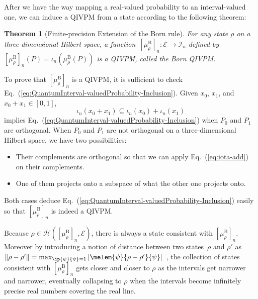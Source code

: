 \documentclass[english,reprint, aps, prl,superscriptaddress, showpacs,
showkeys, longbibliography, amsmath, amssymb, floatfix]{revtex4-1}
\theoremstyle{plain}
\newtheorem{thm}{Theorem}
\theoremstyle{definition}
\newcommand{\Hilb}{\mathcal{H}}
\newcommand{\events}{\ensuremath{\mathcal{E}}}
\newcommand{\coreBorn}{\ensuremath{\overline{\Hilb}}}
\begin{document}
After we have the way mapping a real-valued probability to an interval-valued
one, we can induce a QIVPM from a state according to the following
theorem:

\begin{thm}[Finite-precision Extension of the Born rule]\label{thm:Finite-precision-Born}For
any state $\rho$ on a three-dimensional Hilbert space, a function~$\left[\mu_{\rho}^{\mathrm{B}}\right]_{n}:\events\rightarrow\mathscr{I}_{n}$
defined by $\left[\mu_{\rho}^{\mathrm{B}}\right]_{n}\left(P\right)=\iota_{n}\left(\mu_{\rho}^{\mathrm{B}}\left(P\right)\right)$
is a QIVPM, called the Born QIVPM.\end{thm}

\noindent To prove that $\left[\mu_{\rho}^{\mathrm{B}}\right]_{n}$
is a QIVPM, it is sufficient to check Eq.~(\ref{eq:QuantumInterval-valuedProbability-Inclusion}).
Given $x_{0}$, $x_{1}$, and $x_{0}+x_{1}\in\left[0,1\right]$,
\begin{equation}
\iota_{n}\left(x_{0}+x_{1}\right)\subseteq\iota_{n}\left(x_{0}\right)+\iota_{n}\left(x_{1}\right)\label{eq:iota-add}
\end{equation}
implies Eq.~(\ref{eq:QuantumInterval-valuedProbability-Inclusion})
when $P_{0}$ and $P_{1}$ are orthogonal. When $P_{0}$ and $P_{1}$
are not orthogonal on a three-dimensional Hilbert space, we have two
possibilities:
\begin{itemize}
\item Their complements are orthogonal so that we can apply Eq.~(\ref{eq:iota-add})
on their complements.
\item One of them projects onto a subspace of what the other one projects
onto.
\end{itemize}
\noindent Both cases deduce Eq.~(\ref{eq:QuantumInterval-valuedProbability-Inclusion})
easily so that $\left[\mu_{\rho}^{\mathrm{B}}\right]_{n}$ is indeed
a QIVPM.

Because $\rho\in\coreBorn\left(\left[\mu_{\rho}^{\mathrm{B}}\right]_{n},\events\right)$,
there is always a state consistent with $\left[\mu_{\rho}^{\mathrm{B}}\right]_{n}$.
Moreover by introducing a notion of distance between two states~$\rho$
and $\rho'$ as $\left\Vert \rho-\rho'\right\Vert =\max_{\ip{\psi}{\psi}=1}\left|\melem{\psi}{\rho-\rho'}{\psi}\right|$~\citep{544199},
the collection of states consistent with $\left[\mu_{\rho}^{\mathrm{B}}\right]_{n}$
gets closer and closer to $\rho$ as the intervals get narrower and
narrower, eventually collapsing to $\rho$ when the intervals become
infinitely precise real numbers covering the real line.
\end{document}
